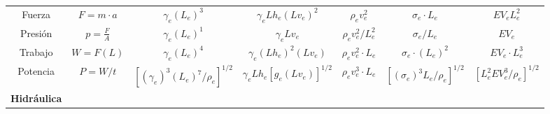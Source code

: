 \begin{table}[h!]
\begin{turn}{90}
\begin{tabular}{@{}ccccccc@{}}
    Fuerza                                                                         & $F=m\cdot a$                  & $\gamma_e\left(L_e\right)^3$                                          & $\gamma_eLh_e\left(Lv_e\right)^2$                                                    & $\rho_ev_e^2$                                                                     & $\sigma_e\cdot L_e$                                                             & $EV_eL_e^2$                             \\
    Presión                                                                        & $p=\frac{F}{A}$               & $\gamma_e\left(L_e\right)^1$                                          & $\gamma_e Lv_e$                                                                      & $\rho_ev_e^2/L_e^2$                                                               & $\sigma_e/ L_e$                                                                 & $EV_e$                                  \\
    Trabajo                                                                        & $W=F(L)$                      & $\gamma_e\left(L_e\right)^4$                                          & $\gamma_e\left(Lh_e\right)^2(Lv_e)$                                                  & $\rho_ev_e^2\cdot L_e$                                                            & $\sigma_e\cdot \left(L_e\right)^2$                                              & $EV_e\cdot L_e^3$                       \\
    Potencia                                                                       & $P=W/t$                       & $\left[\left(\gamma_e\right)^3\left(L_e\right)^7/\rho_e\right]^{1/2}$ & $\gamma_e Lh_e\left[g_e\left(Lv_e\right)\right]^{1/2}$                               & $\rho_ev_e^3\cdot L_e$                                                            & $\left[\left(\sigma_e\right)^3L_e/\rho_e\right]^{1/2}$                          & $\left[L_e^2EV_e^3/\rho_e\right]^{1/2}$ \\
    \multicolumn{1}{l}{\textbf{Hidráulica}}                                        &                               &                                                                       &                                                                                      &                                                                                   &                                                                                 &                                         \\

\end{tabular}
\end{turn}
\end{table}
